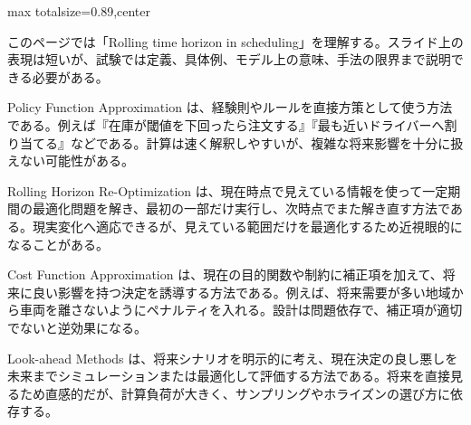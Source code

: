 \begin{minipage}[t]{0.58\textwidth}
\begin{adjustbox}{max totalsize={\textwidth}{0.89\textheight},center}
\begin{minipage}{\textwidth}\scriptsize
{}このページでは「Rolling time horizon in scheduling」を理解する。スライド上の表現は短いが、試験では定義、具体例、モデル上の意味、手法の限界まで説明できる必要がある。\par
Policy Function Approximation は、経験則やルールを直接方策として使う方法である。例えば『在庫が閾値を下回ったら注文する』『最も近いドライバーへ割り当てる』などである。計算は速く解釈しやすいが、複雑な将来影響を十分に扱えない可能性がある。\par
Rolling Horizon Re-Optimization は、現在時点で見えている情報を使って一定期間の最適化問題を解き、最初の一部だけ実行し、次時点でまた解き直す方法である。現実変化へ適応できるが、見えている範囲だけを最適化するため近視眼的になることがある。\par
Cost Function Approximation は、現在の目的関数や制約に補正項を加えて、将来に良い影響を持つ決定を誘導する方法である。例えば、将来需要が多い地域から車両を離さないようにペナルティを入れる。設計は問題依存で、補正項が適切でないと逆効果になる。\par
Look-ahead Methods は、将来シナリオを明示的に考え、現在決定の良し悪しを未来までシミュレーションまたは最適化して評価する方法である。将来を直接見るため直感的だが、計算負荷が大きく、サンプリングやホライズンの選び方に依存する。\par

\end{minipage}
\end{adjustbox}
\end{minipage}
